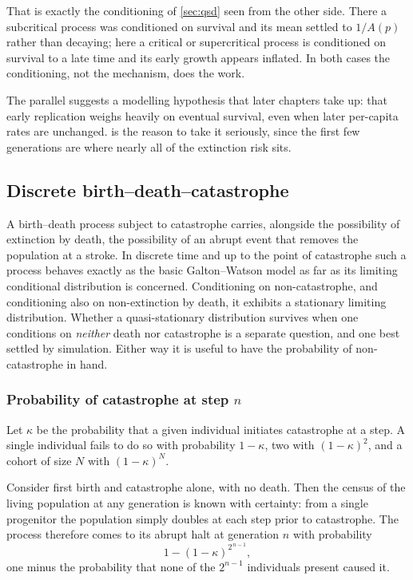 That is exactly the conditioning of \cref{sec:qsd} seen from the other side. There
a subcritical process was conditioned on survival and its mean settled to $1/A(p)$
rather than decaying; here a critical or supercritical process is conditioned on
survival to a late time and its early growth appears inflated. In both cases the
conditioning, not the mechanism, does the work.

The parallel suggests a modelling hypothesis that later chapters take up: that
early replication weighs heavily on eventual survival, even when later per-capita
rates are unchanged.  is the reason to take it seriously, since
the first few generations are where nearly all of the extinction risk sits.

\subsection{Discrete birth--death--catastrophe}
\label{sec:bdc}

A birth--death process subject to catastrophe carries, alongside the possibility of
extinction by death, the possibility of an abrupt event that removes the population
at a stroke. In discrete time and up to the point of catastrophe such a process
behaves exactly as the basic Galton--Watson model as far as its limiting
conditional distribution is concerned. Conditioning on non-catastrophe, and
conditioning also on non-extinction by death, it exhibits a stationary limiting
distribution. Whether a quasi-stationary distribution survives when one conditions
on \emph{neither} death nor catastrophe is a separate question, and one best
settled by simulation. Either way it is useful to have the probability of
non-catastrophe in hand.

\subsubsection*{Probability of catastrophe at step \texorpdfstring{$n$}{n}}

Let $\kappa$ be the probability that a given individual initiates catastrophe at a
step. A single individual fails to do so with probability $1-\kappa$, two with
$(1-\kappa)^2$, and a cohort of size $N$ with $(1-\kappa)^N$.

Consider first birth and catastrophe alone, with no death. Then the census of the
living population at any generation is known with certainty: from a single
progenitor the population simply doubles at each step prior to catastrophe. The
process therefore comes to its abrupt halt at generation $n$ with probability
\begin{equation}
\label{eq:bdchalt}
1-(1-\kappa)^{2^{\,n-1}},
\end{equation}
one minus the probability that none of the $2^{n-1}$ individuals present caused it.

